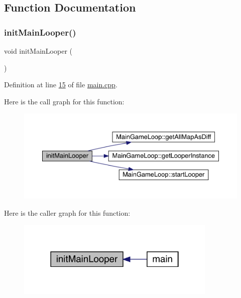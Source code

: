 \subsection{Function Documentation}
\mbox{\label{a00241_a3cfb6b17f20d62ad08b9402764f3aa6c}} 
\subsubsection{\texorpdfstring{init\+Main\+Looper()}{initMainLooper()}}
{\footnotesize\ttfamily void init\+Main\+Looper (\begin{DoxyParamCaption}{ }\end{DoxyParamCaption})}



Definition at line \hyperlink{a00241_source_l00015}{15} of file \hyperlink{a00241_source}{main.\+cpp}.

Here is the call graph for this function\+:
\nopagebreak
\begin{figure}[H]
\begin{center}
\leavevmode
\includegraphics[width=350pt]{d6/db6/a00241_a3cfb6b17f20d62ad08b9402764f3aa6c_cgraph}
\end{center}
\end{figure}
Here is the caller graph for this function\+:
\nopagebreak
\begin{figure}[H]
\begin{center}
\leavevmode
\includegraphics[width=270pt]{d6/db6/a00241_a3cfb6b17f20d62ad08b9402764f3aa6c_icgraph}
\end{center}
\end{figure}
\mbox{\label{a00241_a29060721f5ddfa26790f0778bde74ff2}} 
